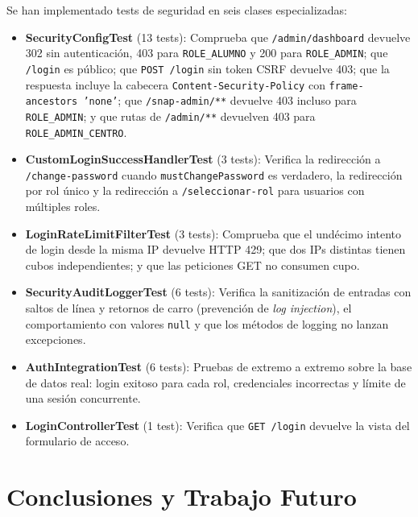 \documentclass[12pt, a4paper]{report}
\begin{document}
Se han implementado tests de seguridad en seis clases especializadas:

\begin{itemize}
  \item \textbf{SecurityConfigTest} (13 tests): Comprueba que
        \texttt{/admin/dashboard} devuelve 302 sin autenticación, 403 para
        \texttt{ROLE\_ALUMNO} y 200 para \texttt{ROLE\_ADMIN}; que
        \texttt{/login} es público; que \texttt{POST /login} sin token CSRF
        devuelve 403; que la respuesta incluye la cabecera
        \texttt{Content-Security-Policy} con \texttt{frame-ancestors 'none'};
        que \texttt{/snap-admin/**} devuelve 403 incluso para
        \texttt{ROLE\_ADMIN}; y que rutas de \texttt{/admin/**} devuelven 403
        para \texttt{ROLE\_ADMIN\_CENTRO}.
  \item \textbf{CustomLoginSuccessHandlerTest} (3 tests): Verifica la redirección
        a \texttt{/change-password} cuando \texttt{mustChangePassword} es verdadero,
        la redirección por rol único y la redirección a \texttt{/seleccionar-rol}
        para usuarios con múltiples roles.
  \item \textbf{LoginRateLimitFilterTest} (3 tests): Comprueba que el undécimo
        intento de login desde la misma IP devuelve HTTP 429; que dos IPs
        distintas tienen cubos independientes; y que las peticiones GET no
        consumen cupo.
  \item \textbf{SecurityAuditLoggerTest} (6 tests): Verifica la sanitización de
        entradas con saltos de línea y retornos de carro (prevención de
        \textit{log injection}), el comportamiento con valores \texttt{null} y
        que los métodos de logging no lanzan excepciones.
  \item \textbf{AuthIntegrationTest} (6 tests): Pruebas de extremo a extremo
        sobre la base de datos real: login exitoso para cada rol, credenciales
        incorrectas y límite de una sesión concurrente.
  \item \textbf{LoginControllerTest} (1 test): Verifica que \texttt{GET /login}
        devuelve la vista del formulario de acceso.
\end{itemize}

\chapter{Conclusiones y Trabajo Futuro}
\end{document}
